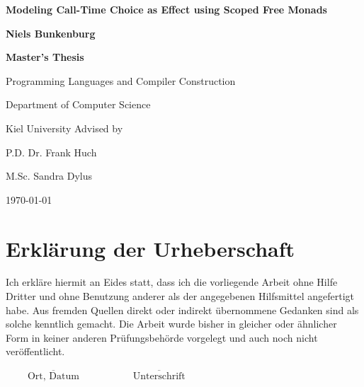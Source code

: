 \documentclass[a4paper, 11pt, fleqn, twoside]{scrreprt}
\begin{document}

\begin{titlepage}
	\vspace*{3cm}
	\centering
	{\huge\bfseries Modeling Call-Time Choice as Effect using Scoped Free 
	Monads\par}
	\vspace{1cm}
	\textbf{Niels Bunkenburg} \par 
	\vspace{6cm}
	\textbf{Master's Thesis} \par
	Programming Languages and Compiler Construction \par
	Department of Computer Science \par
	Kiel University
	\vfill
	Advised by\par
	P.D. Dr. Frank Huch \par
	M.Sc. Sandra Dylus
	\vfill
	{\large \today\par}
\end{titlepage}

\newpage
\thispagestyle{empty}
\strut
\newpage

\chapter*{Erklärung der Urheberschaft}
\vspace{2cm}
Ich erkläre hiermit an Eides statt, dass ich die vorliegende Arbeit ohne Hilfe Dritter und ohne Benutzung anderer als der angegebenen Hilfsmittel angefertigt habe.
Aus fremden Quellen direkt oder indirekt übernommene Gedanken sind als solche kenntlich gemacht.
Die Arbeit wurde bisher in gleicher oder ähnlicher Form in keiner anderen Prüfungsbehörde vorgelegt und auch noch nicht veröffentlicht.

\vspace{4cm}
\hspace{1cm} $\overline{~~~~~~~~~~\mbox{Ort, Datum}~~~~~~~~~~}$ \hfill $\overline{~~~~~~~~~~~~~\mbox{Unterschrift}~~~~~~~~~~~~~}$ \hspace{1cm}

\newpage
\mbox{}
\thispagestyle{empty}
\newpage

\begin{abstract}

\end{abstract}
\end{document}
